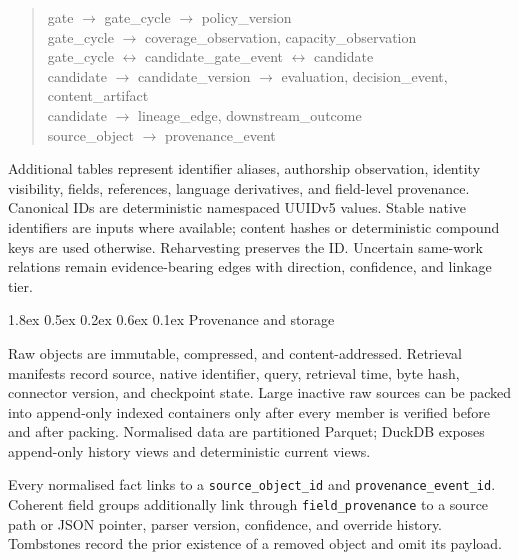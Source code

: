 \documentclass[
  10pt,
]{article}
\makeatletter
\renewcommand\subsubsection{\@startsection{subsubsection}{3}{\z@}%
  {1.8ex \@plus 0.5ex \@minus 0.2ex}%
  {0.6ex \@plus 0.1ex}%
  {\normalfont\normalsize\sffamily\bfseries\color{OSGInk}}}
\makeatother
\begin{document}
\begin{quote}\small\ttfamily
gate $\rightarrow$ gate\_cycle $\rightarrow$ policy\_version\\
gate\_cycle $\rightarrow$ coverage\_observation, capacity\_observation\\
gate\_cycle $\leftrightarrow$ candidate\_gate\_event $\leftrightarrow$ candidate\\
candidate $\rightarrow$ candidate\_version $\rightarrow$ evaluation,
decision\_event, content\_artifact\\
candidate $\rightarrow$ lineage\_edge, downstream\_outcome\\
source\_object $\rightarrow$ provenance\_event
\end{quote}

  {}
  {}

Additional tables represent identifier aliases, authorship observation,
identity visibility, fields, references, language derivatives, and
field-level provenance. Canonical IDs are deterministic namespaced
UUIDv5 values. Stable native identifiers are inputs where available;
content hashes or deterministic compound keys are used otherwise.
Reharvesting preserves the ID. Uncertain same-work relations remain
evidence-bearing edges with direction, confidence, and linkage tier.

\subsubsection{Provenance and
storage}\label{42-provenance-and-storage}

Raw objects are immutable, compressed, and content-addressed. Retrieval
manifests record source, native identifier, query, retrieval time, byte
hash, connector version, and checkpoint state. Large inactive raw
sources can be packed into append-only indexed containers only after
every member is verified before and after packing. Normalised data are
partitioned Parquet; DuckDB exposes append-only history views and
deterministic current views.

Every normalised fact links to a \texttt{source\_object\_id} and
\texttt{provenance\_event\_id}. Coherent field groups additionally link
through \texttt{field\_provenance} to a source path or JSON pointer,
parser version, confidence, and override history. Tombstones record the
prior existence of a removed object and omit its payload.
\end{document}
